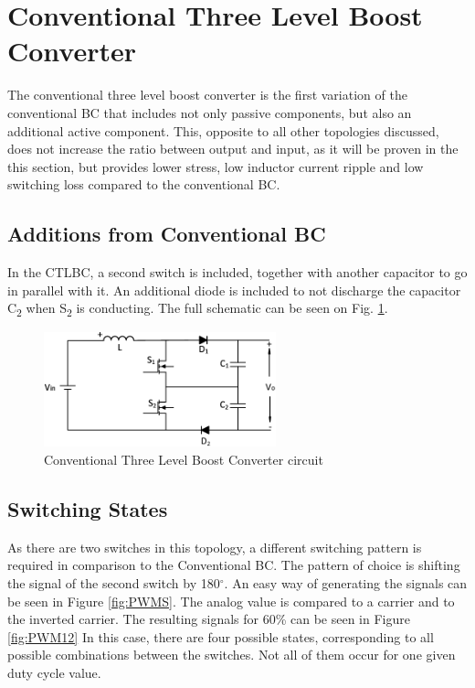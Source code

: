 \section{Conventional Three Level Boost Converter}\label{ch:TLBC}

The conventional three level boost converter is the first variation of the conventional BC that includes not only passive components, but also an additional active component. This, opposite to all other topologies discussed, does not increase the ratio between output and input, as it will be proven in the this section, but provides lower stress, low inductor current ripple and low switching loss compared to the conventional BC. 

\subsection{Additions from Conventional BC}
In the CTLBC, a second switch is included, together with another capacitor to go in parallel with it. An additional diode is included to not discharge the capacitor C\textsubscript{2} when S\textsubscript{2} is conducting.
The full schematic can be seen on Fig. \ref{fig:CTLBC}.  


\begin{figure} [H]
   \centering
   \includegraphics[width=0.6\textwidth]{figures/dConventionalThreeLevelBC/Three_level.pdf}
    \caption{Conventional Three Level Boost Converter circuit}
	\label{fig:CTLBC}
\end{figure}
\subsection{Switching States}

As there are two switches in this topology, a different switching pattern is required in comparison to the Conventional BC. The pattern of choice is shifting the signal of the second switch by 180$^\circ$.
An easy way of generating the signals can be seen in Figure \ref{fig:PWMS}. The analog value is compared to a carrier and to the inverted carrier. The resulting signals for 60\% can be seen in Figure \ref{fig:PWM12}
In this case, there are four possible states, corresponding to all possible combinations between the switches. Not all of them occur for one given duty cycle value. 

